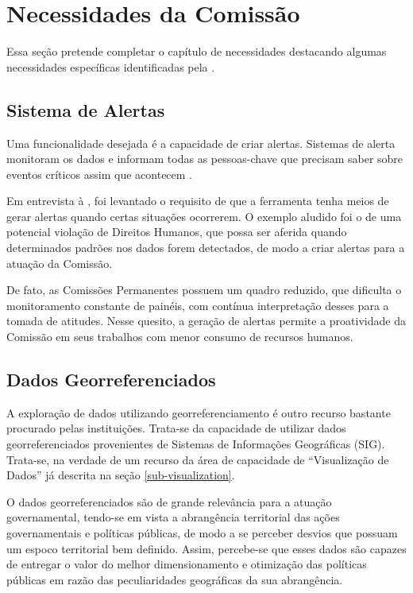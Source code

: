 \section{Necessidades da Comissão} 
\label{sec-necessidadescomissao}

Essa seção pretende completar o capítulo de necessidades destacando algumas necessidades específicas identificadas pela \CDDHCEDP.

\subsection{Sistema de Alertas}
\label{sec-alertas}

Uma funcionalidade desejada é a capacidade de criar alertas. Sistemas de alerta monitoram os dados e informam todas as pessoas-chave que precisam saber sobre eventos críticos assim que acontecem \cite{turban2019}.

Em entrevista à \CDDHCEDP, foi levantado o requisito de que a ferramenta tenha meios de gerar alertas quando certas situações ocorrerem. O exemplo aludido foi o de uma potencial violação de Direitos Humanos, que possa ser aferida quando determinados padrões nos dados forem detectados, de modo a criar alertas para a atuação da Comissão.

De fato, as Comissões Permanentes possuem um quadro reduzido, que dificulta o monitoramento constante de painéis, com contínua interpretação desses para a tomada de atitudes. Nesse quesito, a geração de alertas permite a proatividade da Comissão em seus trabalhos com menor consumo de recursos humanos.


\subsection{Dados Georreferenciados}
\label{sec-geo}

A exploração de dados utilizando georreferenciamento é outro recurso bastante procurado pelas instituições. Trata-se da capacidade de utilizar dados georreferenciados provenientes de Sistemas de Informações Geográficas (SIG). Trata-se, na verdade de um recurso da área de capacidade de ``Visualização de Dados'' já descrita na seção \ref{sub-visualization}. 

O dados georreferenciados são de grande relevância para a atuação governamental, tendo-se em vista a abrangência territorial das ações governamentais e políticas públicas, de modo a se perceber desvios que possuam um espoco territorial bem definido. Assim, percebe-se que esses dados são capazes de entregar o valor do melhor dimensionamento e otimização das políticas públicas em razão das peculiaridades geográficas da sua abrangência.



